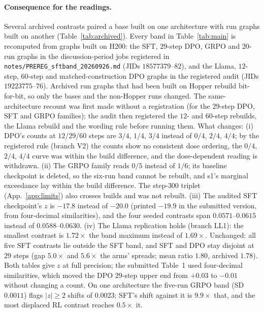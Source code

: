 \documentclass{article}
\begin{document}
\paragraph{Consequence for the readings.} Several archived contrasts paired a base built on one architecture with run graphs built on another (Table~\ref{tab:archived}). Every band in Table~\ref{tab:main} is recomputed from graphs built on H200: the SFT, $29$-step DPO, GRPO and $20$-run graphs in the discussion-period jobs registered in \texttt{notes/PREREG\_sftband\_20260926.md} (JIDs $18577379$--$82$), and the Llama, $12$-step, $60$-step and matched-construction DPO graphs in the registered audit (JIDs $19223775$--$76$). Archived run graphs that had been built on Hopper rebuild bit-for-bit, so only the bases and the non-Hopper runs changed. The same-architecture recount was first made without a registration (for the $29$-step DPO, SFT and GRPO families); the audit then registered the $12$- and $60$-step rebuilds, the Llama rebuild and the wording rule before running them. What changes: (i) DPO's counts at $12$/$29$/$60$ steps are $3/4$, $1/4$, $3/4$ instead of $0/4$, $2/4$, $4/4$; by the registered rule (branch V2) the counts show no consistent dose ordering, the $0/4$, $2/4$, $4/4$ curve was within the build difference, and the dose-dependent reading is withdrawn. (ii) The GRPO family reads $0/5$ instead of $1/6$; its baseline checkpoint is deleted, so the six-run band cannot be rebuilt, and s1's marginal exceedance lay within the build difference. The step-$300$ triplet (App.~\ref{app:limits}) also crosses builds and was not rebuilt. (iii) The audited SFT checkpoint's $z$ is $-17.8$ instead of $-20.0$ (printed $-19.9$ in the submitted version, from four-decimal similarities), and the four seeded contrasts span $0.0571$--$0.0615$ instead of $0.0588$--$0.0630$. (iv) The Llama replication holds (branch LL1): the smallest contrast is $1.72\times$ the band maximum instead of $1.69\times$. Unchanged: all five SFT contrasts lie outside the SFT band, and SFT and DPO stay disjoint at $29$ steps (gap $5.0\times$ and $5.6\times$ the arms' spreads; mean ratio $1.80$, archived $1.78$). Both tables give $z$ at full precision; the submitted Table~1 used four-decimal similarities, which moved the DPO $29$-step upper end from $+0.03$ to $-0.01$ without changing a count. On one architecture the five-run GRPO band (SD $0.0011$) flags $|z|\ge2$ shifts of $0.0023$; SFT's shift against it is $9.9\times$ that, and the most displaced RL contrast reaches $0.5\times$ it.
\end{document}
